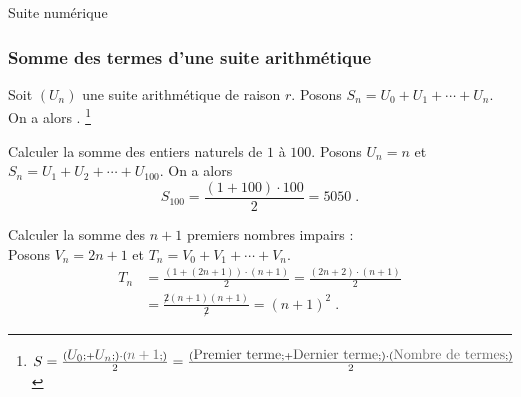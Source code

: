 \begin{chapter}{Suite num\'erique}
\subsubsection{Somme des termes d'une suite arithm\'etique}
%
Soit $(U_n)$ une suite arithm\'etique de raison $r$.
Posons $S_n = U_0 + U_1 + \cdots + U_n$.
On a alors
.%
\footnote{%
				$
					S = \frac{(
					\tikznode{U0}{\textcolor{loko2}{$U_0$}};
					+
					\tikznode{Un}{\textcolor{loko1}{$U_n$}};
					)
					\cdot
					(
					\tikznode{n+1}{\textcolor{loko3}{$n+1$}};
					)
					}{
					2
					}
					=
					\frac{ (\tikznode{Premier terme}{$\text{\textcolor{loko2}{Premier terme}}$}; 
					+ 
					\tikznode{Dernier terme}{$\text{\textcolor{loko1}{Dernier terme}}$}; )
					\cdot
					( \tikznode{Nombre de termes}{$\text{\textcolor{loko3}{Nombre de termes}}$}; )
					}{ 2 }
				$
			}
%
\begin{ex}
Calculer la somme des entiers naturels de $1$ \`a $100$.
Posons $U_n = n$ et $S_n = U_1 + U_2 + \cdots + U_{100}$.
On a alors 
$$
S_{100} = \frac{(1 + 100) \cdot 100}{2} = 5050 \; .
$$

Calculer la somme des $n + 1$ premiers nombres impairs : \\
Posons $V_n = 2n+1$ et $T_n = V_0 + V_1 + \cdots + V_n$.
\begin{align*}
T_n & = \frac{(1 + (2n+1)) \cdot (n+1)}{2}       
      = \frac{(2 n + 2) \cdot (n+1)}{2}          \\
    & = \frac{\not 2 (n+1) (n+1)}{\not 2}        
      = (n+1)^2                                  \;.
\end{align*}
\end{ex}
%

\end{chapter}
